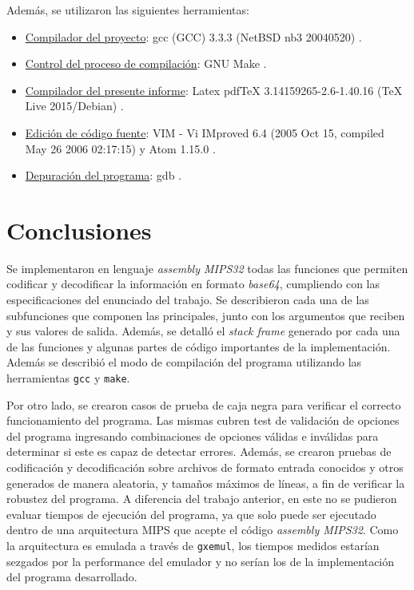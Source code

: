 Además, se utilizaron las siguientes herramientas:
\begin{itemize}
	\item \underline{Compilador del proyecto}: gcc (GCC) 3.3.3 (NetBSD nb3 20040520) \cite{tool_gcc}.
	\item \underline{Control del proceso de compilación}: GNU Make \cite{tool_gnuMake}.
	\item \underline{Compilador del presente informe}: Latex pdfTeX 3.14159265-2.6-1.40.16 (TeX Live 2015/Debian) \cite{tool_latex}.
    \item \underline{Edición de código fuente}: VIM - Vi IMproved 6.4 (2005 Oct 15, compiled May 26 2006 02:17:15) y Atom 1.15.0 \cite{tool_vim} \cite{tool_atom}.
	\item \underline{Depuración del programa}: gdb \cite{tool_gdb}.
\end{itemize}

\section{Conclusiones}

Se implementaron en lenguaje \textit{assembly MIPS32} todas las funciones que permiten codificar y decodificar la información en formato \textit{base64}, cumpliendo con las especificaciones del enunciado del trabajo.
Se describieron cada una de las subfunciones que componen las principales, junto con los argumentos que reciben y sus valores de salida. Además, se detalló el \textit{stack frame} generado por cada una de las funciones  y algunas partes de código importantes de la implementación.
Además se describió el modo de compilación del programa utilizando las herramientas \texttt{gcc} y \texttt{make}.

\hfill

Por otro lado, se crearon casos de prueba de caja negra para verificar el correcto funcionamiento del programa. Las mismas cubren test de validación de opciones del programa ingresando combinaciones de opciones válidas e inválidas para determinar si este es capaz de detectar errores. Además, se crearon pruebas de codificación y decodificación sobre archivos de formato entrada conocidos y otros generados de manera aleatoria, y tamaños máximos de líneas, a fin de verificar la robustez del programa.
A diferencia del trabajo anterior, en este no se pudieron evaluar tiempos de ejecución del programa, ya que solo puede ser ejecutado dentro de una arquitectura MIPS que acepte el código \textit{assembly MIPS32}. Como la arquitectura es emulada a través de \texttt{gxemul}, los tiempos medidos estarían sezgados por la performance del emulador y no serían los de la implementación del programa desarrollado.

